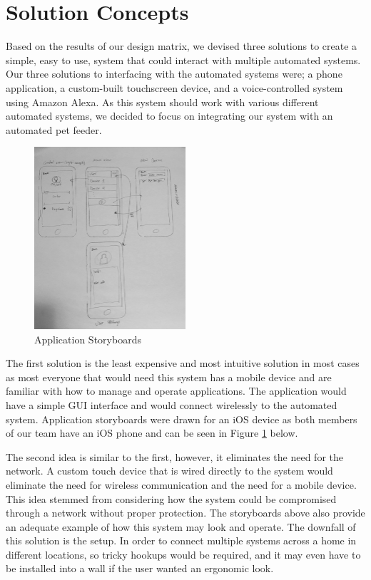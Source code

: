 \documentclass[notitlepage,11pt]{article}
\begin{document}
    \section{Solution Concepts}

        Based on the results of our design matrix, we devised three solutions to create a simple, easy to use, system 
        that could interact with multiple automated systems.  Our three solutions to interfacing with the automated systems 
        were; a phone application, a custom-built touchscreen device, and a voice-controlled system using Amazon Alexa.  
        As this system should work with various different automated systems, we decided to focus 
        on integrating our system with an automated pet feeder.

        \begin{figure}[!htb]
            \centering
            \includegraphics[width=0.5\textwidth]{images/story.jpg}  
            \caption{Application Storyboards}
            \label{fig:story}
        \end{figure}

        The first solution is the least expensive and most intuitive solution in most cases as most everyone that would 
        need this system has a mobile device and are familiar with how to manage and operate applications. The application 
        would have a simple GUI interface and would connect wirelessly to the automated system. Application storyboards 
        were drawn for an iOS device as both members of our team have an iOS phone and can be seen in Figure \ref{fig:story} below.

        The second idea is similar to the first, however, it eliminates the need for the network. A custom touch device 
        that is wired directly to the system would eliminate the need for wireless communication and the need for a 
        mobile device. This idea stemmed from considering how the system could be compromised through a network without 
        proper protection. The storyboards above also provide an adequate example of how this system may look and 
        operate. The downfall of this solution is the setup. In order to connect multiple systems across a home in 
        different locations, so tricky hookups would be required, and it may even have to be installed into a wall if 
        the user wanted an ergonomic look.
\end{document}
